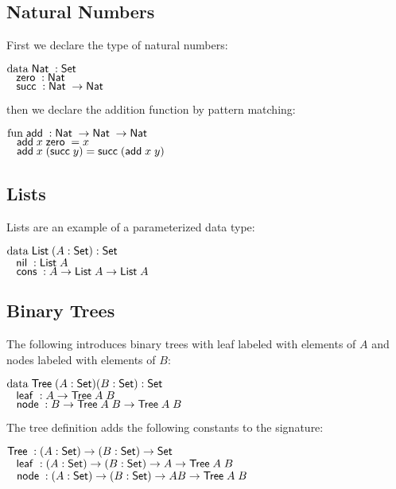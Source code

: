 \subsection{Natural Numbers}
First we declare the type of natural numbers:
\begin{bsp}
$\data \Nat : \Set$ \\
$\spc \zero : \Nat $\\
$\spc \suc : \Nat \ra \Nat$
\end{bsp}
then we declare the addition function by pattern matching:
\begin{bsp}
$\fun \add : \Nat \ra \Nat \ra \Nat$\\
$\spc \add x \; \zero = x $\\
$\spc \add x \; (\suc y) = \suc (\add x \; y)  $
\end{bsp}
\subsection{Lists}
Lists are an example of a parameterized data type:
\begin{bsp}
$\data \List ( A : \Set ) : \Set $ \\
$ \spc \nil : \List A  $\\
$ \spc \cons : A \ra \List A \ra \List A $
\end{bsp}
\subsection{Binary Trees}
The following introduces binary trees with leaf labeled with elements of $A$ and nodes labeled with elements of $B$:
\begin{bsp}
$\data \Tree ( A : \Set ) ( B : \Set ) : \Set $ \\
$ \spc \leaf : A \ra \Tree A \; B $\\
$ \spc \node : B \ra \Tree A \; B \ra \Tree A \; B $
\end{bsp}
The tree definition adds the following constants to the signature:
\begin{bsp}
$\Tree  : ( A : \Set ) \ra ( B : \Set ) \ra \Set$ \\
$ \spc \leaf : ( A : \Set ) \ra ( B : \Set ) \ra A \ra \Tree A \; B $ \\
$ \spc \node : ( A : \Set ) \ra ( B : \Set ) \ra A B \ra \Tree A \; B $
\end{bsp}
